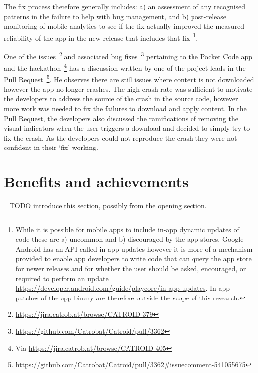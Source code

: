 The fix process therefore generally includes: a) an assessment of any recognised patterns in the failure to help with bug management, and b) post-release monitoring of mobile analytics to see if the fix actually improved the measured reliability of the app in the new release that includes that fix~\footnote{While it is possible for mobile apps to include in-app dynamic updates of code these are a) uncommon and b) discouraged by the app stores. Google Android has an API called in-app updates however it is more of a mechanism provided to enable app developers to write code that can query the app store for newer releases and for whether the user should be asked, encouraged, or required to perform an update %
\url{https://developer.android.com/guide/playcore/in-app-updates}. In-app patches of the app binary are therefore outside the scope of this research.}. 

One of the issues~\footnote{\url{https://jira.catrob.at/browse/CATROID-379}} and associated bug fixes~\footnote{\url{https://github.com/Catrobat/Catroid/pull/3362}} pertaining to the Pocket Code app and the hackathon~\footnote{Via \url{https://jira.catrob.at/browse/CATROID-405}} has a discussion written by one of the project leads in the Pull Request~\footnote{\url{https://github.com/Catrobat/Catroid/pull/3362\#issuecomment-541055675}}. 
He observes there are still issues where content is not downloaded however the app no longer crashes. The high crash rate was sufficient to motivate the developers to address the source of the crash in the source code, however more work was needed to fix the failures to download and apply content. In the Pull Request, the developers also discussed the ramifications of removing the visual indicators when the user triggers a download and decided to simply try to fix the crash. As the developers could not reproduce the crash they were not confident in their `fix' working.


\section{Benefits and achievements}~\label{aiu-benefits-and-achievements-section}
TODO introduce this section, possibly from the opening section.

